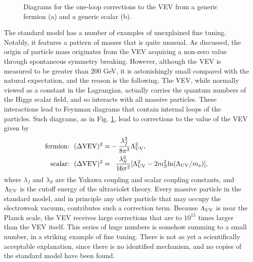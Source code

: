 \begin{figure}[h]
\caption{Diagrams for the one-loop corrections to the VEV from a generic fermion (a) and a generic scalar (b).} 
\label{fig:VevLoops}
\end{figure}
The standard model has a number of examples of unexplained fine tuning. Notably, it features a pattern of masses that is quite unusual. As discussed, the origin of particle mass originates from the VEV acquiring a non-zero value through spontaneous symmetry breaking. However, although the VEV is measured to be greater than 200 GeV, it is astonishingly small compared with the natural expectation, and the reason is the following.  The VEV, while normally viewed as a constant in the Lagrangian, actually carries the quantum numbers of the Higgs scalar field, and so interacts with all massive particles. These interactions lead to Feynman diagrams that contain internal loops of the particles. Such diagrams, as in Fig. \ref{fig:VevLoops}, lead to corrections to the value of the VEV given by
\begin{align}
{\rm fermion\hspace{-.1cm}:\ \ }(\Delta {\rm VEV})^2 =& -\frac{\lambda_f^2}{8\pi^2}\cutoff^{2},\label{eq:FermLoop}\\
{\rm scalar\hspace{-.1cm}:\ \ }(\Delta {\rm VEV})^2 =& \hphantom{-} \frac{\lambda_{S}^2}{16\pi^2}[\cutoff^{2}-2m_{S}^2{\rm ln}(\cutoff / m_s)],
\label{eq:ScalarLoop}
\end{align}
where $\lambda_f$ and $\lambda_S$ are the Yukawa coupling and scalar coupling constants, and $\Lambda_{\rm UV}$ is the cutoff energy of the ultraviolet theory. Every massive particle in the standard model, and in principle any other particle that may occupy the electroweak vacuum, contributes such a correction term. Because $\Lambda_{\rm UV}$ is near the Planck scale, the VEV receives large corrections that are to $10^{15}$ times larger than the VEV itself. This series of huge numbers is somehow summing to a small number, in a striking example of fine tuning. There is not as yet a scientifically acceptable explanation, since there is no identified mechanism, and no copies of the standard model have been found.


